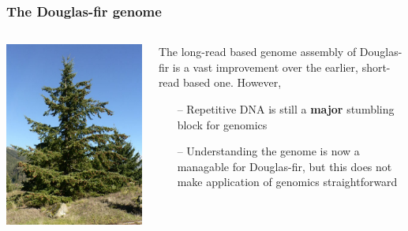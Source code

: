 \documentclass{beamer}
\begin{document}
		
	\begin{frame}
		
		\frametitle{The Douglas-fir genome}
		\small
		\begin{columns}
			\begin{column}{0.5\textwidth}
				\centering	\includegraphics[keepaspectratio, width  = \textwidth]{img/doug-fir}\\
							\end{column}
			\begin{column}{0.5\textwidth}
				
				The long-read based genome assembly of Douglas-fir is a vast improvement over the earlier, short-read based one. However, 
				\begin{itemize}
					\item[--] Repetitive DNA is still a \textbf{major }stumbling block for genomics
					\item[--] Understanding the genome is now a managable for Douglas-fir, but this does not make application of genomics straightforward

				\end{itemize}
			\end{column}
		\end{columns}
	\end{frame}
	
\end{document}
